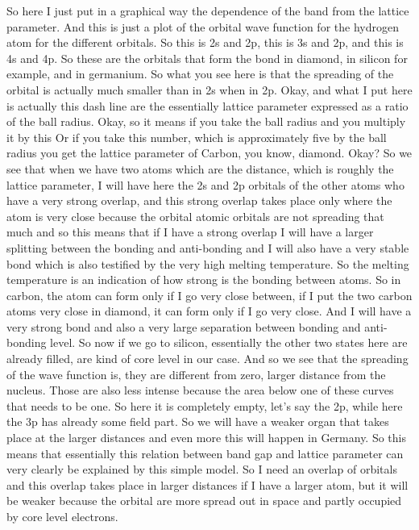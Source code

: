 So here I just put in a graphical way the dependence of the band from the lattice parameter. And this is just a plot of the orbital wave function for the hydrogen atom for the different orbitals. So this is 2s and 2p, this is 3s and 2p, and this is 4s and 4p. So these are the orbitals that form the bond in diamond, in silicon for example, and in germanium. So what you see here is that the spreading of the orbital is actually much smaller than in 2s when in 2p. Okay, and what I put here is actually this dash line are the essentially lattice parameter expressed as a ratio of the ball radius. Okay, so it means if you take the ball radius and you multiply it by this Or if you take this number, which is approximately five by the ball radius you get the lattice parameter of Carbon, you know, diamond. Okay? So we see that when we have two atoms which are the distance, which is roughly the lattice parameter, I will have here the 2s and 2p orbitals of the other atoms who have a very strong overlap, and this strong overlap takes place only where the atom is very close because the orbital atomic orbitals are not spreading that much and so this means that if I have a strong overlap I will have a larger splitting between the bonding and anti-bonding and I will also have a very stable bond which is also testified by the very high melting temperature. So the melting temperature is an indication of how strong is the bonding between atoms. So in carbon, the atom can form only if I go very close between, if I put the two carbon atoms very close in diamond, it can form only if I go very close. And I will have a very strong bond and also a very large separation between bonding and anti-bonding level. So now if we go to silicon, essentially the other two states here are already filled, are kind of core level in our case. And so we see that the spreading of the wave function is, they are different from zero, larger distance from the nucleus. Those are also less intense because the area below one of these curves that needs to be one. So here it is completely empty, let's say the 2p, while here the 3p has already some field part. So we will have a weaker organ that takes place at the larger distances and even more this will happen in Germany. So this means that essentially this relation between band gap and lattice parameter can very clearly be explained by this simple model. So I need an overlap of orbitals and this overlap takes place in larger distances if I have a larger atom, but it will be weaker because the orbital are more spread out in space and partly occupied by core level electrons.
